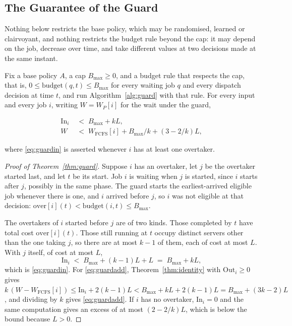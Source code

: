 \subsection{The Guarantee of the Guard}
\label{sec:th_guard}

Nothing below restricts the base policy, which may be randomised, learned or clairvoyant,
and nothing restricts the budget rule beyond the cap: it may depend on the job, decrease
over time, and take different values at two decisions made at the same instant.

\begin{theorem}
\label{thm:guard}
Fix a base policy $A$, a cap $B_{\max} \ge 0$, and a budget rule that respects the cap,
that is, $0 \le \mathrm{budget}(q,t) \le B_{\max}$ for every waiting job $q$ and every
dispatch decision at time $t$, and run Algorithm~\ref{alg:guard} with that rule. For every
input and every job $i$, writing $W = W_P[i]$ for the wait under the guard,
\begin{linenomath}
\begin{align}
  \mathrm{In}_i &\;<\; B_{\max} + kL ,
  \label{eq:guardin}\\
  W &\;<\; W_{\mathrm{FCFS}}[i] + B_{\max}/k + (3 - 2/k)L ,
  \label{eq:guardadd}
\end{align}
\end{linenomath}
where \eqref{eq:guardin} is asserted whenever $i$ has at least one overtaker.
\end{theorem}

\begin{proof}[Proof of Theorem~\ref{thm:guard}]
Suppose $i$ has an overtaker, let $j$ be the overtaker started last, and let $t$ be its
start. Job $i$ is waiting when $j$ is started, since $i$ starts after $j$, possibly in the
same phase. The guard starts the earliest-arrived eligible job whenever there is one, and
$i$ arrived before $j$, so $i$ was not eligible at that decision:
$\mathrm{over}[i](t) < \mathrm{budget}(i,t) \le B_{\max}$.

The overtakers of $i$ started before $j$ are of two kinds. Those completed by $t$ have total
cost $\mathrm{over}[i](t)$. Those still running at $t$ occupy distinct servers other than
the one taking $j$, so there are at most $k-1$ of them, each of cost at most $L$. With $j$
itself, of cost at most $L$,
\[
  \mathrm{In}_i \;<\; B_{\max} + (k-1)L + L \;=\; B_{\max} + kL ,
\]
which is \eqref{eq:guardin}. For \eqref{eq:guardadd}, Theorem~\ref{thm:identity} with
$\mathrm{Out}_i \ge 0$ gives $k\,(W - W_{\mathrm{FCFS}}[i]) \le \mathrm{In}_i + 2(k-1)L <
B_{\max} + kL + 2(k-1)L = B_{\max} + (3k-2)L$, and dividing by $k$ gives
\eqref{eq:guardadd}. If $i$ has no overtaker, $\mathrm{In}_i = 0$ and the same computation
gives an excess of at most $(2-2/k)L$, which is below the bound because $L > 0$.
\end{proof}

